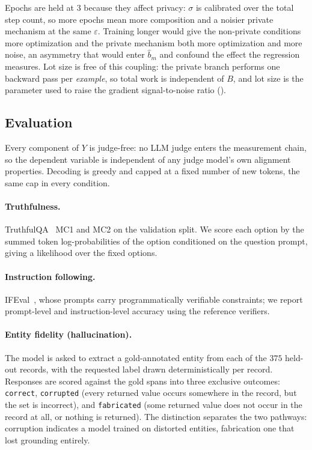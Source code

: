 Epochs are held at $3$ because they affect privacy:
$\sigma$ is calibrated over the total step count,
so more epochs mean more composition and a noisier private mechanism at the same $\varepsilon$.
Training longer would give the non-private conditions more optimization and the private mechanism both more optimization and more noise,
an asymmetry that would enter $\hat b_m$ and confound the effect the regression measures.
Lot size is free of this coupling:
the private branch performs one backward pass per \textit{example},
so total work is independent of $B$,
and lot size is the parameter used to raise the gradient signal-to-noise ratio ().

\subsection{\label{apx:eval}Evaluation}
Every component of $Y$ is judge-free:
no LLM judge enters the measurement chain,
so the dependent variable is independent of any judge model's own alignment properties.
Decoding is greedy and capped at a fixed number of new tokens,
the same cap in every condition.

\paragraph{Truthfulness.}
TruthfulQA~\citep{lin2022truthfulqa} MC1 and MC2 on the validation split.
We score each option by the summed token log-probabilities of the option conditioned on the question prompt,
giving a likelihood over the fixed options.

\paragraph{Instruction following.}
IFEval~\citep{zhou2023instruction},
whose prompts carry programmatically verifiable constraints;
we report prompt-level and instruction-level accuracy using the reference verifiers.

\paragraph{Entity fidelity (hallucination).}
The model is asked to extract a gold-annotated entity from each of the $375$ held-out records,
with the requested label drawn deterministically per record.
Responses are scored against the gold spans into three exclusive outcomes:
\texttt{correct},
\texttt{corrupted} (every returned value occurs somewhere in the record, but the set is incorrect),
and \texttt{fabricated} (some returned value does not occur in the record at all, or nothing is returned).
The distinction separates the two pathways:
corruption indicates a model trained on distorted entities,
fabrication one that lost grounding entirely.


